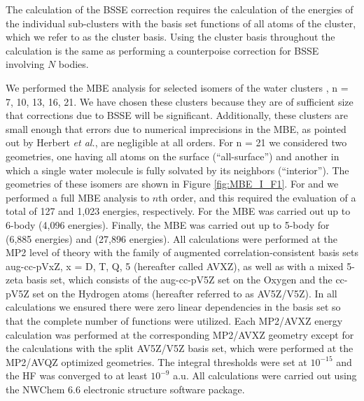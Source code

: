 \documentclass[11pt, proquest]{uwthesis}[2020/02/24]
\let\ce\ch
\begin{document}


\par The calculation of the BSSE correction requires the calculation of the energies of the individual sub-clusters with the basis set functions of all atoms of the cluster, which we refer to as the cluster basis. Using the cluster basis throughout the calculation is the same as performing a counterpoise correction for BSSE involving $N$ bodies.
\par We performed the MBE analysis for selected isomers of the water clusters \ce{(H2O)n}, n = 7, 10, 13, 16, 21.\autocite{lagutschenkov_spectroscopic_2005, yoo_high-level_2010, iwata_cooperative_2013, bulusu_lowest-energy_2006, yoo_structures_2017} We have chosen these clusters because they are of sufficient size that corrections due to BSSE will be significant. Additionally, these clusters are small enough that errors due to numerical imprecisions in the MBE, as pointed out by Herbert \textit{et al.},\autocite{richard_understanding_2014} are negligible at all orders. For n = 21 we considered two geometries, one having all atoms on the surface (“all-surface”) and another in which a single water molecule is fully solvated by its neighbors (“interior”). The geometries of these isomers are shown in Figure \ref{fig:MBE_I_F1}. For \ce{(H2O)7} and \ce{(H2O)_{10}} we performed a full MBE analysis to $n$th order, and this required the evaluation of a total of 127 and 1,023 energies, respectively. For \ce{(H2O)_{13}} the MBE was carried out up to 6-body (4,096 energies). Finally, the MBE was carried out up to 5-body for \ce{(H2O)_{16}} (6,885 energies) and \ce{(H2O)_{21}} (27,896 energies). All calculations were performed at the MP2 level of theory with the family of augmented correlation-consistent basis sets\autocite{dunning_gaussian_1989} aug-cc-pVxZ, x = D, T, Q, 5 (hereafter called AVXZ), as well as with a mixed 5-zeta basis set, which consists of the aug-cc-pV5Z set on the Oxygen and the cc-pV5Z set on the Hydrogen atoms (hereafter referred to as AV5Z/V5Z). In all calculations we ensured there were zero linear dependencies in the basis set so that the complete number of functions were utilized. Each MP2/AVXZ energy calculation was performed at the corresponding MP2/AVXZ geometry except for the calculations with the split AV5Z/V5Z basis set, which were performed at the MP2/AVQZ optimized geometries. The integral thresholds were set at $10^{-15}$ and the HF was converged to at least $10^{-9}$ a.u. All calculations were carried out using the NWChem 6.6 electronic structure software package.\autocite{valiev_nwchem_2010}
\end{document}
